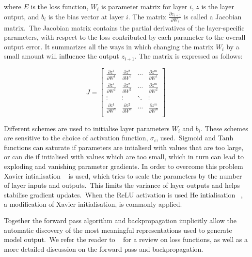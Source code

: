 \noindent where $ E $ is the loss function, $ W_i $ is parameter matrix for layer $ i $, $ z $ is the layer output, and $ b_i $ is the bias vector at layer $ i $. The matrix $ \frac{\partial z_{i + 1}} {\partial W_i} $ is called a Jacobian matrix.\ The Jacobian matrix contains the partial derivatives of the layer-specific parameters, with respect to the loss contributed by each parameter to the overall output error. It summarizes all the ways in which changing the matrix $ W_i $ by a small amount will influence the output $ z_{i + 1} $. The matrix is expressed as follows: \par
\begin{equation}
	\renewcommand\arraystretch{2}
	J = \begin{bmatrix}
        		\frac{\partial z^1}{\partial W^1} & \frac{\partial z^2}{\partial W^1} & \cdots & \frac{\partial z^m}{\partial W^1} \\
           	\frac{\partial z^1}{\partial W^2} &\frac{\partial z^2}{\partial W^2} & \cdots & \frac{\partial z^m}{\partial W^2} \\
           	\vdots & \vdots & \ddots & \vdots \\
           	\frac{\partial z^1}{\partial W^n} & \frac{\partial z^2}{\partial W^n} & \cdots & \frac{\partial z^m}{\partial W^n} \\
        \end{bmatrix}
\end{equation}

\medskip
\noindent Different schemes are used to initialise layer parameters $ W_i $ and $ b_i $. These schemes are sensitive to the choice of activation function, $ \sigma_i $, used.\ Sigmoid and Tanh functions can saturate if parameters are intialised with values that are too large, or can die if intialised with values which are too small, which in turn can lead to exploding and vanishing parameter gradients. In order to overcome this problem Xavier intialisation \unskip ~\citep{glorot2010understanding} is used, which tries to scale the parameters by the number of layer inputs and outputs.\ This limits the variance of layer outputs and helps stabilise gradient updates.\ When the ReLU activation is used He intialisation \unskip ~\citep{he2015delving}, a modification of Xavier initialisation, is commonly applied. \par

\noindent Together the forward pass algorithm and backpropagation implicitly allow the automatic discovery of the most meaningful representations used to generate model output.\ We refer the reader to \unskip ~\citep{Goodfellow-et-al-2016} for a review on loss functions, as well as a more detailed discussion on the forward pass and backpropagation. 



